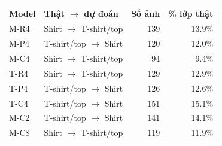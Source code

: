 \begin{tabular}{llrr}
\toprule
Model & Thật $\to$ dự đoán & Số ảnh & \% lớp thật\\
\midrule
M-R4 & Shirt $\to$ T-shirt/top & 139 & 13.9\%\\
M-P4 & T-shirt/top $\to$ Shirt & 120 & 12.0\%\\
M-C4 & Shirt $\to$ T-shirt/top & 94 & 9.4\%\\
T-R4 & Shirt $\to$ T-shirt/top & 129 & 12.9\%\\
T-P4 & T-shirt/top $\to$ Shirt & 126 & 12.6\%\\
T-C4 & T-shirt/top $\to$ Shirt & 151 & 15.1\%\\
M-C2 & T-shirt/top $\to$ Shirt & 141 & 14.1\%\\
M-C8 & Shirt $\to$ T-shirt/top & 119 & 11.9\%\\
\bottomrule
\end{tabular}
